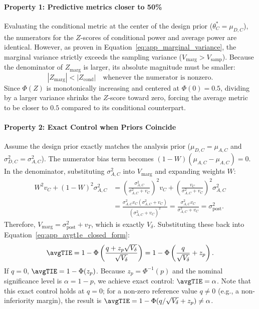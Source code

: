 \paragraph{Property 1: Predictive metrics closer to 50\%}
Evaluating the conditional metric at the center of the design prior ($\theta_C^* = \mu_{D,C}$), the numerators for the $Z$-scores of conditional power and average power are identical. However, as proven in Equation~\eqref{eq:app_marginal_variance}, the marginal variance strictly exceeds the sampling variance ($V_{\text{marg}} > V_{\text{samp}}$). 
Because the denominator of $Z_{\text{marg}}$ is larger, its absolute magnitude must be smaller:
$$
    |Z_{\text{marg}}| < |Z_{\text{cond}}| \quad \text{whenever the numerator is nonzero}.
$$
Since $\Phi(Z)$ is monotonically increasing and centered at $\Phi(0) = 0.5$, dividing by a larger variance shrinks the $Z$-score toward zero, forcing the average metric to be closer to $0.5$ compared to its conditional counterpart. 

\paragraph{Property 2: Exact Control when Priors Coincide}
Assume the design prior exactly matches the analysis prior ($\mu_{D,C} = \mu_{A,C}$ and $\sigma_{D,C}^2 = \sigma_{A,C}^2$). 
The numerator bias term becomes $(1 - W)(\mu_{A,C} - \mu_{A,C}) = 0$. 
In the denominator, substituting $\sigma_{A,C}^2$ into $V_{\text{marg}}$ and expanding weights $W$:
\begin{align*}
    W^2 v_C + (1 - W)^2 \sigma_{A,C}^2 &= \left( \frac{\sigma_{A,C}^2}{\sigma_{A,C}^2 + v_C} \right)^2 v_C + \left( \frac{v_C}{\sigma_{A,C}^2 + v_C} \right)^2 \sigma_{A,C}^2 \\
    &= \frac{\sigma_{A,C}^2 v_C (\sigma_{A,C}^2 + v_C)}{(\sigma_{A,C}^2 + v_C)^2} = \frac{\sigma_{A,C}^2 v_C}{\sigma_{A,C}^2 + v_C} = \sigma_{\text{post}}^2.
\end{align*}
Therefore, $V_{\text{marg}} = \sigma_{\text{post}}^2 + v_T$, which is exactly $V_{\delta}$. Substituting these back into Equation~\eqref{eq:app_avgt1e_closed_form}:
$$
    \avgTIE = 1 - \Phi\left( \frac{q + z_p \sqrt{V_{\delta}}}{\sqrt{V_{\delta}}} \right) = 1 - \Phi\left( \frac{q}{\sqrt{V_{\delta}}} + z_p \right).
$$
If $q = 0$, $\avgTIE = 1 - \Phi(z_p)$. Because $z_p = \Phi^{-1}(p)$ and the nominal significance level is $\alpha = 1 - p$, we achieve exact control: $\avgTIE = \alpha$. Note that this exact control holds at $q = 0$; for a non-zero reference value $q \neq 0$ (e.g., a non-inferiority margin), the result is $\avgTIE = 1 - \Phi(q/\sqrt{V_{\delta}} + z_p) \neq \alpha$.

